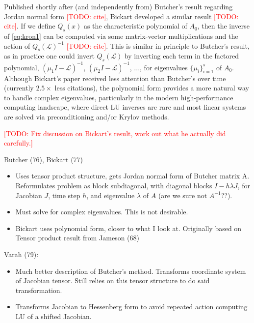 \documentclass[review]{siamart}
\makeatletter
\newcommand{\todo}[1]{\textcolor{red}{[TODO\@: #1]}}
\makeatother
\begin{document}
Published shortly after (and independently from) Butcher's result regarding Jordan normal
form \todo{cite}, Bickart developed a similar result \todo{cite}. If we define $Q_s(x)$ as the characteristic
polynomial of $A_0$, then the inverse of \eqref{eq:kron1} can be computed via some matrix-vector
multiplications and the action of $Q_s(\mathcal{L})^{-1}$ \todo{cite}. This is similar in principle to
Butcher's result, as in practice one could invert $Q_s(\mathcal{L})$ by inverting 
each term in the factored polynomial, $(\mu_1 I-\mathcal{L})^{-1}$,
$(\mu_2 I-\mathcal{L})^{-1}$, ..., for eigenvalues $\{\mu_i\}_{i=1}^s$ of $A_0$.
Although Bickart's paper received less attention than Butcher's over time (currently $2.5\times$
less citations), the polynomial form provides a more natural way to handle complex eigenvalues,
particularly in the modern high-performance computing landscape, where direct LU inverses
are rare and most linear systems are solved via preconditioning and/or Krylov methods. 

\todo{Fix discussion on Bickart's result, work out what he actually did carefully.}

Butcher (76), Bickart (77)
\begin{itemize}
	\item Uses tensor product structure, gets Jordan normal form of Butcher matrix A. Reformulates
	problem as block subdiagonal, with diagonal blocks $I - h\lambda J$, for Jacobian $J$, time step $h$,
	and eigenvalue $\lambda$ of $A$ (are we sure not $A^{-1}$??).
	\item Must solve for complex eigenvalues. This is not desirable. 
	\item Bickart uses polynomial form, closer to what I look at. Originally based on Tensor product
	result from Jameson (68)
\end{itemize}

Varah (79):
\begin{itemize}
	\item Much better description of Butcher's method. Transforms coordinate system of Jacobian tensor.
	Still relies on this tensor structure to do said transformation. 
	\item Transforms Jacobian to Hessenberg form to avoid repeated action computing LU of a shifted 
	Jacobian.
\end{itemize}
\end{document}
